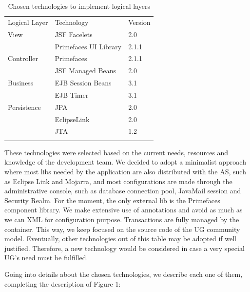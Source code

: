 \documentclass[envcountsame,envcountchap]{svmono}
\begin{document}
\begin{table}
\centering
\caption{Chosen technologies to implement logical layers}
\label{tab:chosen-technologies}
\begin{tabular}{lll}
\hline\noalign{\smallskip}
Logical Layer & Technology & Version \\
\noalign{\smallskip}\hline\noalign{\smallskip}
View & JSF Facelets & 2.0 \\
 & Primefaces UI Library & 2.1.1 \\
\noalign{\smallskip}
Controller & Primefaces & 2.1.1 \\
 & JSF Managed Beans & 2.0 \\
\noalign{\smallskip}
Business & EJB Session Beans & 3.1 \\
 & EJB Timer & 3.1 \\
\noalign{\smallskip}
Persistence & JPA & 2.0 \\
 & EclipseLink & 2.0 \\
 & JTA & 1.2 \\
\noalign{\smallskip}\hline
\end{tabular}
\end{table}

These technologies were selected based on the current needs, resources and knowledge of the development team. We decided to adopt a minimalist approach where most libs needed by the application are also distributed with the AS, such as Eclipse Link and Mojarra, and most configurations are made through the administrative console, such as database connection pool, JavaMail session and Security Realm. For the moment, the only external lib is the Primefaces component library. We make extensive use of annotations and avoid as much as we can XML for configuration purpose. Transactions are fully managed by the container. This way, we keep focused on the source code of the UG community model. Eventually, other technologies out of this table may be adopted if well justified. Therefore, a new technology would be considered in case a very special UG's need must be fulfilled.

Going into details about the chosen technologies, we describe each one of them, completing the description of Figure 1:
\end{document}
